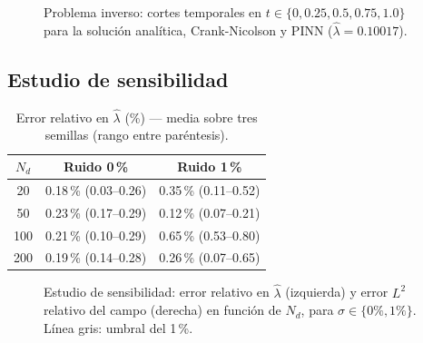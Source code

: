 \documentclass[12pt,a4paper]{article}
\newcommand{\lhat}{\hat{\lambda}}
\begin{document}
\begin{figure}[H]
  \centering
  \caption{Problema inverso: cortes temporales en $t\in\{0,0.25,0.5,0.75,1.0\}$
           para la solución analítica, Crank-Nicolson y PINN ($\lhat=0.10017$).}
  \label{fig:cn_inverso}
\end{figure}

\subsection{Estudio de sensibilidad}

\begin{table}[H]
  \centering
  \caption{Error relativo en $\lhat$ (\%) — media sobre tres semillas (rango entre paréntesis).}
  \label{tab:sensibilidad}
  \begin{tabular}{ccc}\toprule
    $N_d$ & Ruido 0\,\% & Ruido 1\,\%\\\midrule
    20  & 0.18\,\% (0.03--0.26) & 0.35\,\% (0.11--0.52)\\
    50  & 0.23\,\% (0.17--0.29) & 0.12\,\% (0.07--0.21)\\
    100 & 0.21\,\% (0.10--0.29) & 0.65\,\% (0.53--0.80)\\
    200 & 0.19\,\% (0.14--0.28) & 0.26\,\% (0.07--0.65)\\\bottomrule
  \end{tabular}
\end{table}

\begin{figure}[H]
  \centering
  \caption{Estudio de sensibilidad: error relativo en $\lhat$ (izquierda) y error $L^2$
           relativo del campo (derecha) en función de $N_d$, para
           $\sigma\in\{0\%,1\%\}$. Línea gris: umbral del 1\,\%.}
  \label{fig:sens}
\end{figure}
\end{document}
